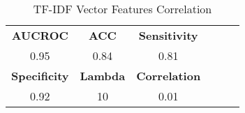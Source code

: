 \documentclass[12pt]{article}
\begin{document}
\begin{table}[hbtp]
  {\begin{tabular}{ccc|ccc}
    \toprule 
    
    \bfseries AUCROC & \bfseries ACC  & \bfseries Sensitivity \\ 
    0.95 & 0.84 & 0.81  \\
    \toprule 
    
    \bfseries Specificity & \bfseries Lambda & \bfseries Correlation \\
    0.92 & 10 & 0.01 \\
    
    \bottomrule
  \end{tabular}}
  {\caption{TF-IDF Vector Features Correlation}}
\end{table}
\end{document}
